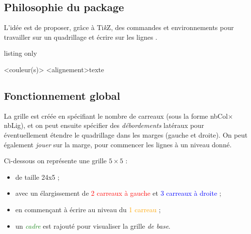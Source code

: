 \documentclass[a4paper]{article}
\providecommand\tikzlogo{Ti\textit{k}Z}
\let\TikZ\tikzlogo
\begin{document}
\subsection{\og Philosophie \fg{} du package}

L'idée est de proposer, grâce à \TikZ, des \textsf{commandes} et \textsf{environnements} pour travailler sur un quadrillage et écrire \og sur les lignes \fg.

\begin{PresentationCode}{listing only}

\begin{EnvQuadrillage}[clés]<couleur(s)>
	\EcrireLigne[clés]<alignement>{texte}
	\PasseLigne
\end{EnvQuadrillage}
\end{PresentationCode}

\subsection{Fonctionnement global}

La grille est créée en spécifiant le nombre de carreaux (sous la forme nbCol$\times$nbLig), et on peut ensuite spécifier des \textit{débordements} latéraux pour éventuellement étendre le quadrillage dans les marges (gauche et droite). On peut également \textit{jouer} sur la marge, pour commencer les lignes à un niveau donné.

\medskip

Ci-dessous on représente une grille $5\times5$ :

\begin{itemize}
	\item de taille 24x5 ;
	\item avec un élargissement de \textcolor{red}{2 carreaux à gauche} et \textcolor{blue}{3 carreaux à droite} ;
	\item en commençant à écrire au niveau du \textcolor{orange}{1 carreau} ;
	\item un \textcolor{ForestGreen}{\textit{cadre}} est rajouté pour visualiser la grille \textit{de base}.
\end{itemize}

\medskip
\end{document}
